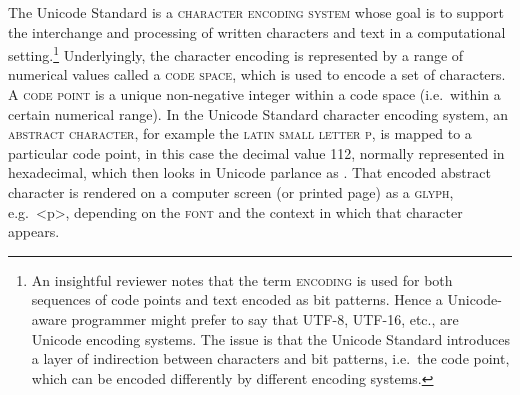 The Unicode Standard is a \textsc{character encoding system} whose
goal is to support the interchange and processing of written characters and
text in a computational setting.\footnote{An insightful reviewer notes that the term \textsc{encoding} is used for both sequences of code points and text encoded as bit patterns. Hence a Unicode-aware programmer might prefer to say that UTF-8, UTF-16, etc., are Unicode encoding systems. The issue is that the Unicode Standard introduces a layer of indirection between characters and bit patterns, i.e.\ the code point, which can be encoded differently by different encoding systems.} Underlyingly, the character encoding is
represented by a range of numerical values called a \textsc{code space}, which
is used to encode a set of characters. A \textsc{code point} is a unique
non-negative integer within a code space (i.e.~within a certain numerical
range). In the Unicode Standard character encoding system, an \textsc{abstract
character}, for example the \textsc{latin small letter p}, is mapped to a
particular code point, in this case the decimal value 112, normally represented in
hexadecimal, which then looks in Unicode parlance as
.
That encoded abstract character is rendered on a computer screen (or
printed page) as a \textsc{glyph}, e.g.\ <p>, depending on the \textsc{font} and
the context in which that character appears.

